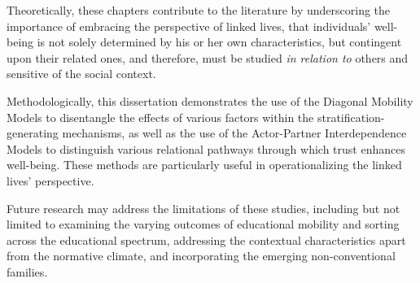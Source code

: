 Theoretically, these chapters contribute to the literature by underscoring the importance of embracing the perspective of linked lives, that individuals' well-being is not solely determined by his or her own characteristics, but contingent upon their related ones, and therefore, must be studied \textit{in relation to} others and sensitive of the social context.

Methodologically, this dissertation demonstrates the use of the Diagonal Mobility Models to disentangle the effects of various factors within the stratification-generating mechanisms, as well as the use of the Actor-Partner Interdependence Models to distinguish various relational pathways through which trust enhances well-being. These methods are particularly useful in operationalizing the linked lives' perspective.

Future research may address the limitations of these studies, including but not limited to examining the varying outcomes of educational mobility and sorting across the educational spectrum, addressing the contextual characteristics apart from the normative climate, and incorporating the emerging non-conventional families.
